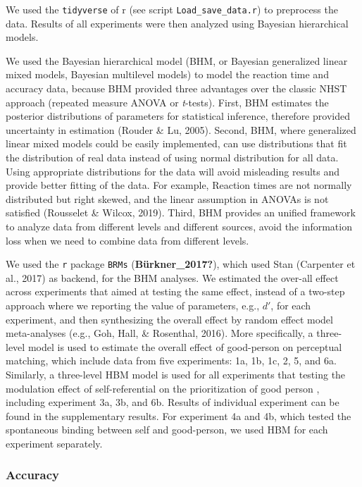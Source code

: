 \documentclass[
  man]{apa6}
\begin{document}
We used the \texttt{tidyverse} of r (see script \texttt{Load\_save\_data.r}) to preprocess the data. Results of all experiments were then analyzed using Bayesian hierarchical models.

We used the Bayesian hierarchical model (BHM, or Bayesian generalized linear mixed models, Bayesian multilevel models) to model the reaction time and accuracy data, because BHM provided three advantages over the classic NHST approach (repeated measure ANOVA or \emph{t}-tests). First, BHM estimates the posterior distributions of parameters for statistical inference, therefore provided uncertainty in estimation (Rouder \& Lu, 2005). Second, BHM, where generalized linear mixed models could be easily implemented, can use distributions that fit the distribution of real data instead of using normal distribution for all data. Using appropriate distributions for the data will avoid misleading results and provide better fitting of the data. For example, Reaction times are not normally distributed but right skewed, and the linear assumption in ANOVAs is not satisfied (Rousselet \& Wilcox, 2019). Third, BHM provides an unified framework to analyze data from different levels and different sources, avoid the information loss when we need to combine data from different levels.

We used the \texttt{r} package \texttt{BRMs} (\textbf{Bürkner\_2017?}), which used Stan (Carpenter et al., 2017) as backend, for the BHM analyses. We estimated the over-all effect across experiments that aimed at testing the same effect, instead of a two-step approach where we reporting the value of parameters, e.g., \(d'\), for each experiment, and then synthesizing the overall effect by random effect model meta-analyses (e.g., Goh, Hall, \& Rosenthal, 2016). More specifically, a three-level model is used to estimate the overall effect of good-person on perceptual matching, which include data from five experiments: 1a, 1b, 1c, 2, 5, and 6a. Similarly, a three-level HBM model is used for all experiments that testing the modulation effect of self-referential on the prioritization of good person , including experiment 3a, 3b, and 6b. Results of individual experiment can be found in the supplementary results. For experiment 4a and 4b, which tested the spontaneous binding between self and good-person, we used HBM for each experiment separately.

\hypertarget{accuracy}{%
\subsubsection{Accuracy}\label{accuracy}}
\end{document}
